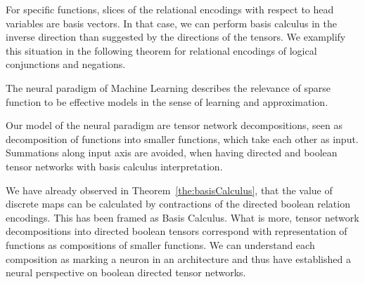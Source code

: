 For specific functions, slices of the relational encodings with respect to head variables are basis vectors.
In that case, we can perform basis calculus in the inverse direction than suggested by the directions of the tensors.
We examplify this situation in the following theorem for relational encodings of logical conjunctions and negations.





The neural paradigm of Machine Learning describes the relevance of sparse function to be effective models in the sense of learning and approximation.

Our model of the neural paradigm are tensor network decompositions, seen as decomposition of functions into smaller functions, which take each other as input.
Summations along input axis are avoided, when having directed and boolean tensor networks with basis calculus interpretation.

We have already observed in Theorem~\ref{the:basisCalculus}, that the value of discrete maps can be calculated by contractions of the directed boolean relation encodings.
This has been framed as Basis Calculus.
What is more, tensor network decompositions into directed boolean tensors correspond with representation of functions as compositions of smaller functions.
We can understand each composition as marking a neuron in an architecture and thus have established a neural perspective on boolean directed tensor networks.
